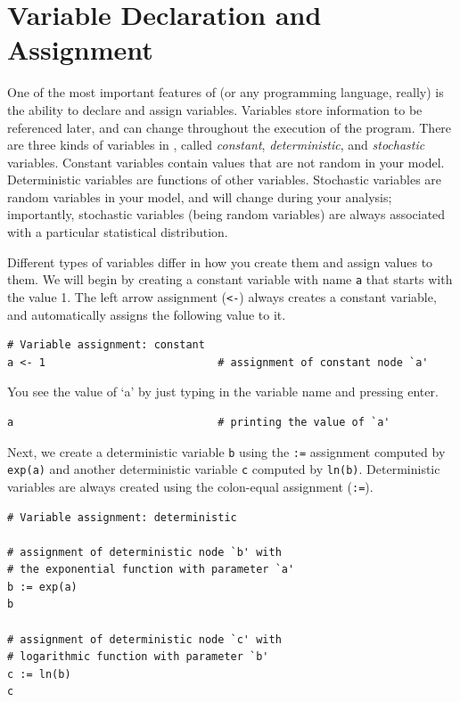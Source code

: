 \section*{Variable Declaration and Assignment}
One of the most important features of \RevBayes (or any programming language, really) is the ability to declare and assign variables.
Variables store information to be referenced later, and can change throughout the execution of the program.
There are three kinds of variables in \RevBayes, called \emph{constant}, \emph{deterministic}, and \emph{stochastic} variables.
Constant variables contain values that are not random in your model.
Deterministic variables are functions of other variables.
Stochastic variables are random variables in your model, and will change during your analysis; importantly, stochastic variables (being random variables) are always associated with a particular statistical distribution.

Different types of variables differ in how you create them and assign values to them.
We will begin by creating a constant variable with name \texttt{a} that starts with the value 1. 
The left arrow assignment (\texttt{<-}) always creates a constant variable, and automatically assigns the following value to it.
{\tt \begin{snugshade*}
\begin{lstlisting}    
# Variable assignment: constant
a <- 1                           # assignment of constant node `a'
\end{lstlisting}
\end{snugshade*}}
You see the value of `a' by just typing in the variable name and pressing enter.
{\tt \begin{snugshade*}
\begin{lstlisting}    
a                                # printing the value of `a'
\end{lstlisting}
\end{snugshade*}}

Next, we create a deterministic variable \texttt{b} using the \texttt{:=} assignment computed by \texttt{exp(a)} and another deterministic variable \texttt{c} computed by \texttt{ln(b)}. 
Deterministic variables are always created using the colon-equal assignment (\texttt{:=}). 

{\tt \begin{snugshade*}
\begin{lstlisting}    
# Variable assignment: deterministic

# assignment of deterministic node `b' with
# the exponential function with parameter `a'
b := exp(a)  
b

# assignment of deterministic node `c' with
# logarithmic function with parameter `b'
c := ln(b)              
c 
\end{lstlisting}
\end{snugshade*}}

